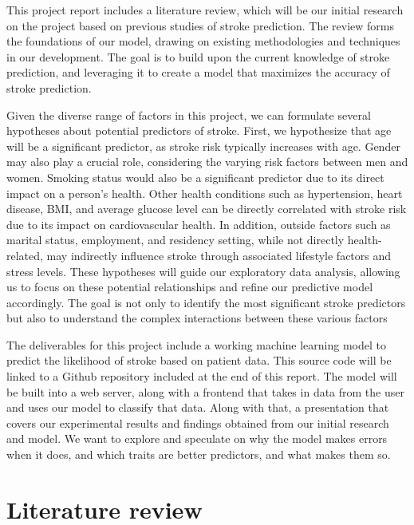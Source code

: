 \documentclass[11pt]{article}
\begin{document}
\medskip

This project report includes a literature review, which will be our initial research on the project based on previous studies of stroke prediction. The review forms the foundations of our model, drawing on existing methodologies and techniques in our development. The goal is to build upon the current knowledge of stroke prediction, and leveraging it to create a model that maximizes the accuracy of stroke prediction. 

\medskip

Given the diverse range of factors in this project, we can formulate several hypotheses about potential predictors of stroke. First, we hypothesize that age will be a significant predictor, as stroke risk typically increases with age. Gender may also play a crucial role, considering the varying risk factors between men and women. Smoking status would also be a significant predictor due to its direct impact on a person’s health.  Other health conditions such as hypertension, heart disease, BMI, and average glucose level can be directly correlated with stroke risk due to its impact on cardiovascular health. In addition, outside factors such as marital status, employment, and residency setting, while not directly health-related, may indirectly influence stroke through associated lifestyle factors and stress levels. These hypotheses will guide our exploratory data analysis, allowing us to focus on these potential relationships and refine our predictive model accordingly. The goal is not only to identify the most significant stroke predictors but also to understand the complex interactions between these various factors

\medskip

The deliverables for this project include a working machine learning model to predict the likelihood of stroke based on patient data. This source code will be linked to a Github repository included at the end of this report. The model will be built into a web server, along with a frontend that takes in data from the user and uses our model to classify that data. Along with that, a presentation that covers our experimental results and findings obtained from our initial research and model. We want to explore and speculate on why the model makes errors when it does, and which traits are better predictors, and what makes them so.

\section*{Literature review}
\end{document}
